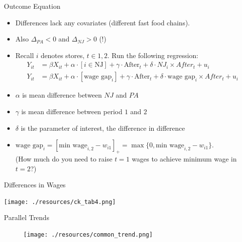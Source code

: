 \begin{frame}{Outcome Equation}
\begin{itemize}
\item Differences lack any covariates (different fast food chains).
\item Also $\Delta_{PA}<0$ and $\Delta_{NJ} > 0$ (!)
\item Recall $i$ denotes stores, $t \in {1,2}$. Run the following regression:
\begin{align*}
Y_{it}&=\beta X_{it} +\alpha \cdot [i \in \text{NJ}] +  \gamma \cdot \text{After}_{t}  + \delta \cdot NJ_i \times After_{t} +u_{i}\\
Y_{it}&=\beta X_{it} +\alpha \cdot [\text{wage gap}_{i}] +  \gamma \cdot \text{After}_{t}  + \delta \cdot \text{wage gap}_{i} \times After_{t} +u_{i}
\end{align*}
\item $\alpha$ is mean difference between $NJ$ and $PA$
\item $\gamma$ is mean difference between period $1$ and $2$
\item $\delta$ is the parameter of interest, the \alert{difference in difference}
\item $\text{wage gap}_{i} = [\text{min wage}_{i,2}-w_{i1} ]_{+} =\max\{0, \text{min wage}_{i,2}-w_{i1}\} $.\\
 (How much do you need to raise $t=1$ wages to achieve minimum wage in $t=2$?)
\end{itemize}
\end{frame}

\begin{frame}{Differences in Wages}
\begin{center}
\texttt{[image: ./resources/ck\_tab4.png]}
\end{center}
\end{frame}


\begin{frame}{Parallel Trends}
\begin{figure}
\centering
\texttt{[image: ./resources/common\_trend.png]}
\end{figure}
\end{frame}



